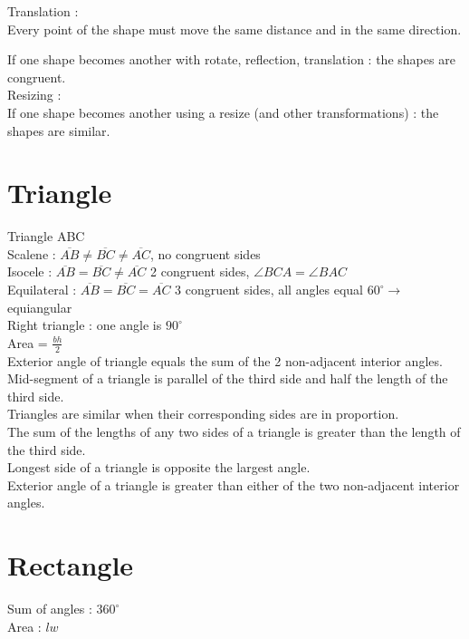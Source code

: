 \documentclass[10pt,onecolumn]{article}
\begin{document}
{Translation : \\
Every point of the shape must move the same distance and in the same direction.

If one shape becomes another with rotate, reflection, translation : the shapes are congruent. \\

Resizing : \\

If one shape becomes another using a resize (and other transformations) : the shapes are similar. \\

\section{Triangle }
Triangle ABC \\
Scalene  : \(\overline{AB} \neq \overline{BC} \neq \overline{AC} \), no congruent sides \\
Isocele  : \(\overline{AB} = \overline{BC} \neq \overline{AC} \) 2 congruent sides,  \(\angle BCA = \angle BAC\) \\
Equilateral : \(\overline{AB} = \overline{BC} = \overline{AC} \) 3 congruent sides, all angles equal \(60^\circ \rightarrow\) equiangular \\
Right triangle :  one angle is \(90^\circ\) \\
Area = \(\frac{bh}{2}\) \\
Exterior angle of triangle equals the sum of the 2 non-adjacent interior angles. \\
Mid-segment of a triangle is parallel of the third side and half the length of the third side. \\
Triangles are similar when their corresponding sides are in proportion. \\
The sum of the lengths of any two sides of a triangle is greater than the length of the third side. \\
Longest side of a triangle is opposite the largest angle. \\
Exterior angle of a triangle is greater than either of the two non-adjacent interior angles. \\

\section{Rectangle }

Sum of angles : \(360^\circ \) \\
Area : \(lw\)

}
\end{document}
